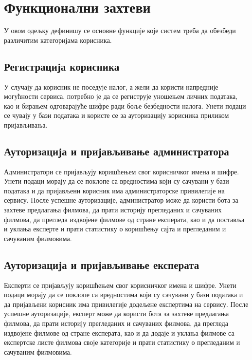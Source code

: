 \section{Функционални захтеви}

У овом одељку дефинишу се основне функције које систем треба да обезбеди различитим категоријама
корисника.

\subsection{Регистрација корисника}

У случају да корисник не поседује налог, а жели да користи напредније могућности сервиса, потребно је да
се региструје уношењем личних података, као и бирањем одговарајуће шифре ради боље безбедности налога. Унети
подаци се чувају у бази података и користе се за ауторизацију корисника приликом пријављивања.

\subsection{Ауторизација и пријављивање администратора}

Администратори се пријављују коришћењем свог корисничког имена и шифре. Унети подаци морају да се поклопе са
вредностима који су сачувани у бази података и да пријављени корисник има администраторске привилегије на
сервису. После успешне ауторизације, администратор може да користи бота за захтеве предлагања филмова, да
прати историју прегледаних и сачуваних филмова, да прегледа издвојене филмове од стране експерата, као и да
поставља и уклања експерте и прати статистику о коришћењу сајта и прегледаним и сачуваним филмовима.

\subsection{Ауторизација и пријављивање експерата}

Експерти се пријављују коришћењем свог корисничког имена и шифре. Унети подаци морају да се поклопе са
вредностима који су сачувани у бази података и да пријављени корисник има привилегије додељене експертима на
сервису. После успешне ауторизације, експерт може да користи бота за захтеве предлагања филмова, да
прати историју прегледаних и сачуваних филмова, да прегледа издвојене филмове од стране експерата, као и да
додаје и уклања филмове са експертске листе филмова своје категорије и прати статистику о прегледаним и
сачуваним филмовима.

